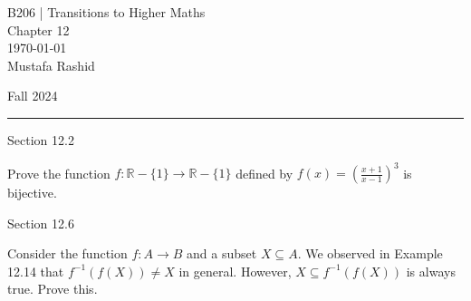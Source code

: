 \documentclass[12pt,letterpaper, onecolumn]{exam}
\begin{document}
	\begingroup  
	\noindent\LARGE B206 | Transitions to Higher Maths\\
	\noindent\LARGE Chapter 12\\
	\noindent\large \today\\
	\noindent\large Mustafa Rashid\par
	\noindent\large Fall 2024\par
	\endgroup
	\rule{\textwidth}{0.4pt}
	\pointsdroppedatright
	\printanswers
	\renewcommand{\solutiontitle}{\noindent\textbf{Ans:}\enspace}  
	\centerline{Section 12.2}
	\begin{questions}
		\setcounter{question}{9}\question Prove the function $f:\mathbb{R}-\{1\}\rightarrow \mathbb{R}-\{1\}$ defined by $f(x)=\left(\frac{x+1}{x-1}\right)^3$ is bijective.
	\end{questions}	
	\centerline{Section 12.6}
	\begin{questions}
		\setcounter{question}{4}\question Consider the function $f:A\rightarrow B$ and a subset $X\subseteq A.$ We observed in Example 12.14 that $f^{-1}(f(X))\neq X$ in general. However, $X\subseteq f^{-1}(f(X))$ is always true. Prove this.
	\end{questions}
\end{document}

